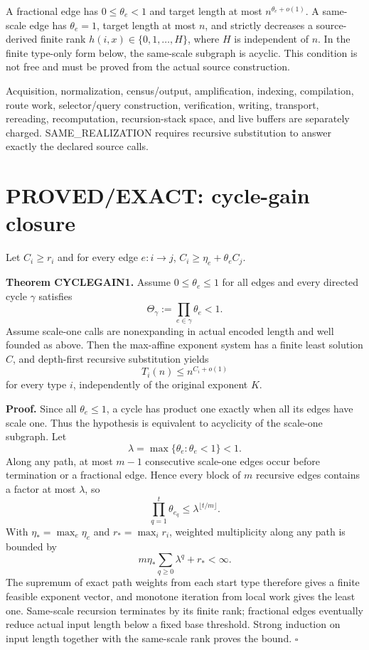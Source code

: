 \documentclass[11pt]{article}
\begin{document}
A fractional edge has \(0\le\theta_e<1\) and target length at most \(n^{\theta_e+o(1)}\). A same-scale edge has \(\theta_e=1\), target length at most \(n\), and strictly decreases a source-derived finite rank \(h(i,x)\in\{0,1,\ldots,H\}\), where \(H\) is independent of \(n\). In the finite type-only form below, the same-scale subgraph is acyclic. This condition is not free and must be proved from the actual source construction.

Acquisition, normalization, census/output, amplification, indexing, compilation, route work, selector/query construction, verification, writing, transport, rereading, recomputation, recursion-stack space, and live buffers are separately charged. SAME\_REALIZATION requires recursive substitution to answer exactly the declared source calls.

\section*{PROVED/EXACT: cycle-gain closure}
Let \(C_i\ge r_i\) and for every edge \(e:i\to j\), \(C_i\ge \eta_e+\theta_e C_j\).

\textbf{Theorem CYCLEGAIN1.} Assume \(0\le\theta_e\le1\) for all edges and every directed cycle \(\gamma\) satisfies
\[
\boxed{\Theta_\gamma:=\prod_{e\in\gamma}\theta_e<1.}
\]
Assume scale-one calls are nonexpanding in actual encoded length and well founded as above. Then the max-affine exponent system has a finite least solution \(C\), and depth-first recursive substitution yields
\[
\boxed{T_i(n)\le n^{C_i+o(1)}}
\]
for every type \(i\), independently of the original exponent \(K\).

\textbf{Proof.} Since all \(\theta_e\le1\), a cycle has product one exactly when all its edges have scale one. Thus the hypothesis is equivalent to acyclicity of the scale-one subgraph. Let
\[
\lambda=\max\{\theta_e:\theta_e<1\}<1.
\]
Along any path, at most \(m-1\) consecutive scale-one edges occur before termination or a fractional edge. Hence every block of \(m\) recursive edges contains a factor at most \(\lambda\), so
\[
\prod_{q=1}^{t}\theta_{e_q}\le\lambda^{\lfloor t/m\rfloor}.
\]
With \(\eta_*=\max_e\eta_e\) and \(r_*=\max_i r_i\), weighted multiplicity along any path is bounded by
\[
m\eta_*\sum_{q\ge0}\lambda^q+r_*<\infty.
\]
The supremum of exact path weights from each start type therefore gives a finite feasible exponent vector, and monotone iteration from local work gives the least one. Same-scale recursion terminates by its finite rank; fractional edges eventually reduce actual input length below a fixed base threshold. Strong induction on input length together with the same-scale rank proves the bound. \(\square\)
\end{document}
